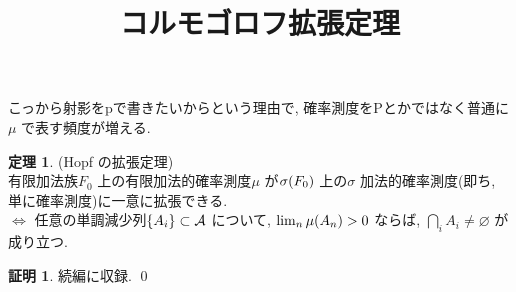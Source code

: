 \documentclass[10pt, fleqn, label-section=none]{bxjsarticle}
\title{コルモゴロフ拡張定理}
\date{}
\author{}
\theoremstyle{definition}
\newtheorem{thm}[dfn]{定理}
\newtheorem*{pf*}{証明}
\newcommand{\paren}[1]{\mleft( #1\mright )}
\newcommand{\cbra}[1]{\mleft\{#1\mright\}}
\newcommand{\LR}{\Leftrightarrow}
\renewcommand{\;}{\, ; \,}
\begin{document}
\maketitle



\section{}

こっから射影をpで書きたいからという理由で, 確率測度をPとかではなく普通に$\mu$ で表す頻度が増える.

\begin{thm}
(Hopf の拡張定理) \\
有限加法族$ F _0$ 上の有限加法的確率測度$\mu$ が$\sigma\paren{ F _0}$ 上の$\sigma$ 加法的確率測度(即ち, 単に確率測度)に一意に拡張できる. \\
$\LR$ 任意の単調減少列$\cbra{A_i} \subset \mathcal{A}$ について, $\lim_n \mu\paren{A_n} > 0$ ならば, $\bigcap_i A_i \neq \varnothing$ が成り立つ.

\end{thm}
\begin{pf*}
続編に収録.
\qed
\end{pf*}
\end{document}
